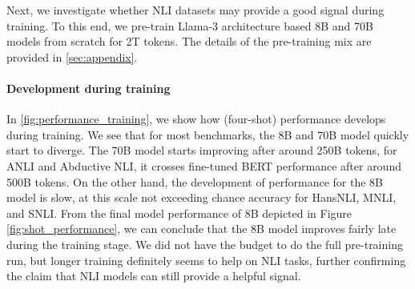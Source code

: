 Next, we investigate whether NLI datasets may provide a good signal during training.
To this end, we pre-train Llama-3 architecture based 8B and 70B models from scratch for 2T tokens.
The details of the pre-training mix are provided in \cref{sec:appendix}. 

\paragraph{Development during training} In \cref{fig:performance_training}, we show how (four-shot) performance develops during training.
We see that for most benchmarks, the 8B and 70B model quickly start to diverge.
The 70B model starts improving after around 250B tokens, for ANLI and Abductive NLI, it crosses fine-tuned BERT performance after around 500B tokens.
On the other hand, the development of performance for the 8B model is slow, at this scale not exceeding chance accuracy for HansNLI, MNLI, and SNLI. 
From the final model performance of 8B depicted in Figure \cref{fig:shot_performance}, we can conclude that the 8B model improves fairly late during the training stage. 
We did not have the budget to do the full pre-training run, but longer training definitely seems to help on NLI tasks, further confirming the claim that NLI models can still provide a helpful signal.

